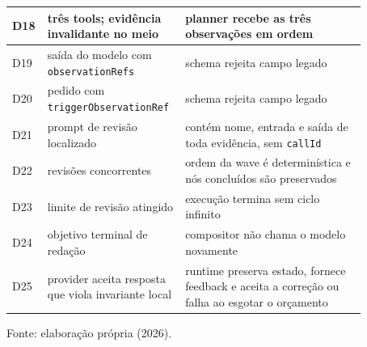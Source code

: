 \begin{longtable}{|p{0.07\linewidth}|p{0.31\linewidth}|p{0.49\linewidth}|}
\hline
D18 & três tools; evidência invalidante no meio & planner recebe as três observações em ordem \\
\hline
D19 & saída do modelo com \texttt{observationRefs} & schema rejeita campo legado \\
\hline
D20 & pedido com \texttt{triggerObservationRef} & schema rejeita campo legado \\
\hline
D21 & prompt de revisão localizado & contém nome, entrada e saída de toda evidência, sem \texttt{callId} \\
\hline
D22 & revisões concorrentes & ordem da wave é determinística e nós concluídos são preservados \\
\hline
D23 & limite de revisão atingido & execução termina sem ciclo infinito \\
\hline
D24 & objetivo terminal de redação & compositor não chama o modelo novamente \\
\hline
D25 & provider aceita resposta que viola invariante local & runtime preserva estado, fornece feedback e aceita a correção ou falha ao esgotar o orçamento \\
\hline
\end{longtable}
\par\smallskip\raggedright\small Fonte: elaboração própria (2026).
